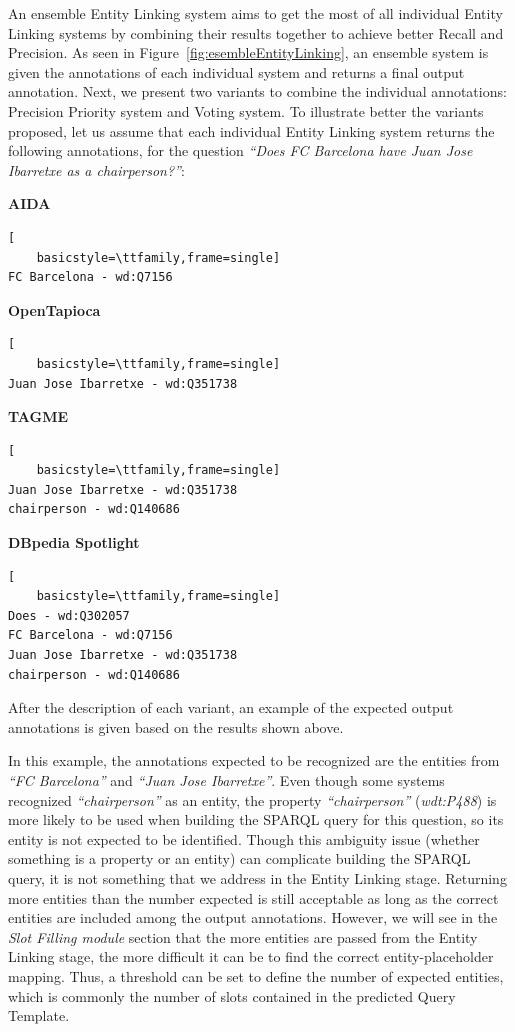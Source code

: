 An ensemble Entity Linking system aims to get the most of all individual Entity Linking 
systems by combining their results together to achieve better Recall and Precision. As seen 
in Figure~\ref{fig:esembleEntityLinking}, an ensemble system is given the annotations of each 
individual system and returns a final output annotation. Next, we present two variants to 
combine the individual annotations: Precision Priority system and Voting system. To illustrate 
better the variants proposed, let us assume that each individual Entity Linking system returns 
the following annotations, for the question \textit{“Does FC Barcelona have Juan Jose 
Ibarretxe as a chairperson?”}:

\textbf{AIDA}
\begin{lstlisting}[
    basicstyle=\ttfamily,frame=single]
FC Barcelona - wd:Q7156
\end{lstlisting}

\textbf{OpenTapioca}
\begin{lstlisting}[
    basicstyle=\ttfamily,frame=single]
Juan Jose Ibarretxe - wd:Q351738  
\end{lstlisting}

\textbf{TAGME}
\begin{lstlisting}[
    basicstyle=\ttfamily,frame=single]
Juan Jose Ibarretxe - wd:Q351738    
chairperson - wd:Q140686  
\end{lstlisting}

\textbf{DBpedia Spotlight}
\begin{lstlisting}[
    basicstyle=\ttfamily,frame=single]
Does - wd:Q302057
FC Barcelona - wd:Q7156
Juan Jose Ibarretxe - wd:Q351738
chairperson - wd:Q140686    
\end{lstlisting}

After the description of each variant, an example of the expected output annotations is given 
based on the results shown above.

In this example, the annotations expected to be recognized are the entities from \textit{“FC 
Barcelona”} and \textit{“Juan Jose Ibarretxe”}. Even though some systems recognized 
\textit{“chairperson”} as an entity, the property \textit{“chairperson”} (\textit{wdt:P488}) 
is more likely to be used when building the SPARQL query for this question, so its entity is 
not expected to be identified. Though this ambiguity issue (whether something is a property or 
an entity) can complicate building the SPARQL query, it is not something that we address in 
the Entity Linking stage. Returning more entities than the number expected is still acceptable 
as long as the correct entities are included among the output annotations. However, we will 
see in the \textit{Slot Filling module} section that the more entities are passed from the 
Entity Linking stage, the more difficult it can be to find the correct entity-placeholder 
mapping. Thus, a threshold can be set to define the number of expected entities, which is 
commonly the number of slots contained in the predicted Query Template.


